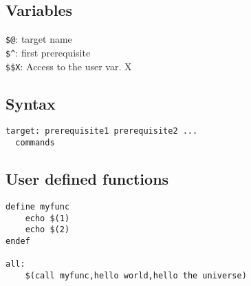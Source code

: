 \subsection{Variables}
\verb|$@|: target name\\
\verb|$^|: first prerequisite\\
\verb|$$X|: Access to the user var. X\\

\subsection{Syntax}
\begin{verbatim}
target: prerequisite1 prerequisite2 ...
  commands
\end{verbatim}

\subsection{User defined functions}
\begin{verbatim}
define myfunc
    echo $(1)
    echo $(2)
endef

all:
    $(call myfunc,hello world,hello the universe)
\end{verbatim}
